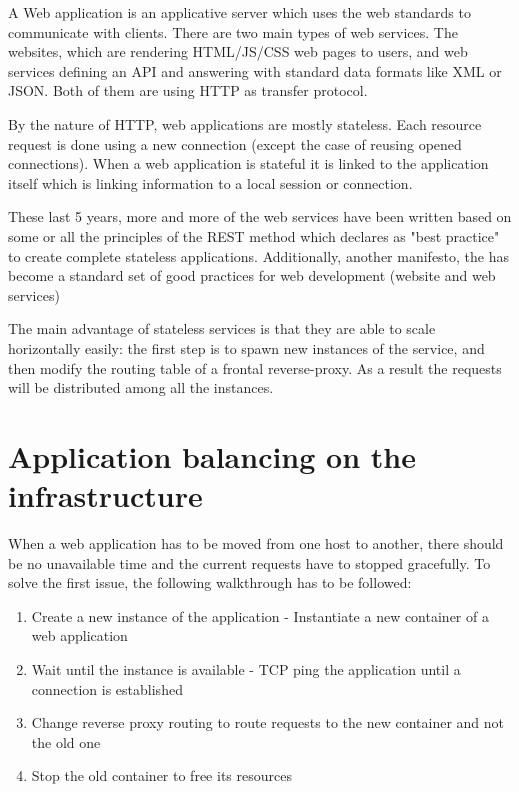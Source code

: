 A Web application is an applicative server which uses the web standards to
communicate with clients. There are two main types of web services. The
websites, which are rendering HTML/JS/CSS web pages to users, and web services
defining an API and answering with standard data formats like XML or JSON. Both
of them are using HTTP as transfer protocol.

By the nature of HTTP, web applications are mostly stateless. Each resource
request is done using a new connection (except the case of reusing opened
connections). When a web application is stateful it is linked to the
application itself which is linking information to a local session or
connection.

These last 5 years, more and more of the web services have been written based
on some or all the principles of the REST method which declares as "best
practice" to create complete stateless applications. Additionally, another
manifesto, the \cite{website12Factors} has become a standard set of good
practices for web development (website and web services)

The main advantage of stateless services is that they are able to scale
horizontally easily: the first step is to spawn new instances of the service,
and then modify the routing table of a frontal reverse-proxy. As a result the
requests will be distributed among all the instances.

\section{Application balancing on the infrastructure}

When a web application has to be moved from one host to another, there should
be no unavailable time and the current requests have to stopped gracefully. To
solve the first issue, the following walkthrough has to be followed:

\begin{enumerate}
	\item{Create a new instance of the application - Instantiate a new
	container of a web application}
	\item{Wait until the instance is available - TCP ping the application
	until a connection is established}
	\item{Change reverse proxy routing to route requests to the new
	container and not the old one}
	\item{Stop the old container to free its resources}
\end{enumerate}

